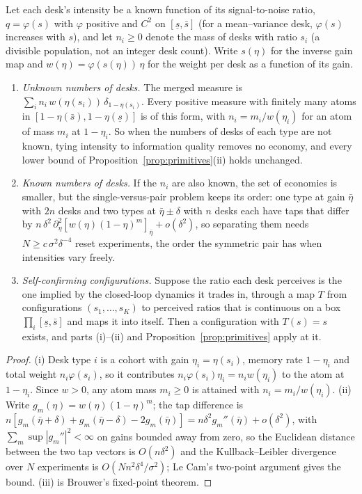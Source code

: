 \begin{proposition}\label{prop:tied}
Let each desk's intensity be a known function of its signal-to-noise ratio, $q=\varphi(s)$ with $\varphi$ positive and $C^2$ on $[\underline s,\bar s]$ (for a mean--variance desk, $\varphi(s)$ increases with $s$), and let $n_i\ge0$ denote the mass of desks with ratio $s_i$ (a divisible population, not an integer desk count). Write $s(\eta)$ for the inverse gain map and $w(\eta)=\varphi(s(\eta))\,\eta$ for the weight per desk as a function of its gain.
\begin{enumerate}[label=(\roman*)]
\item \emph{Unknown numbers of desks.} The merged measure is $\sum_in_i\,w(\eta(s_i))\,\delta_{1-\eta(s_i)}$. Every positive measure with finitely many atoms in $[1-\eta(\bar s),1-\eta(\underline s)]$ is of this form, with $n_i=m_i/w(\eta_i)$ for an atom of mass $m_i$ at $1-\eta_i$. So when the numbers of desks of each type are not known, tying intensity to information quality removes no economy, and every lower bound of Proposition~\ref{prop:primitives}(ii) holds unchanged.
\item \emph{Known numbers of desks.} If the $n_i$ are also known, the set of economies is smaller, but the single-versus-pair problem keeps its order: one type at gain $\bar\eta$ with $2n$ desks and two types at $\bar\eta\pm\delta$ with $n$ desks each have taps that differ by $n\,\delta^2\,\partial_\eta^2[w(\eta)(1-\eta)^m]_{\bar\eta}+o(\delta^2)$, so separating them needs $N\ge c\,\sigma^2\delta^{-4}$ reset experiments, the order the symmetric pair has when intensities vary freely.
\item \emph{Self-confirming configurations.} Suppose the ratio each desk perceives is the one implied by the closed-loop dynamics it trades in, through a map $T$ from configurations $(s_1,\dots,s_K)$ to perceived ratios that is continuous on a box $\prod_i[\underline s,\bar s]$ and maps it into itself. Then a configuration with $T(s)=s$ exists, and parts (i)--(ii) and Proposition~\ref{prop:primitives} apply at it.
\end{enumerate}
\end{proposition}

\begin{proof}
(i) Desk type $i$ is a cohort with gain $\eta_i=\eta(s_i)$, memory rate $1-\eta_i$ and total weight $n_i\varphi(s_i)$, so it contributes $n_i\varphi(s_i)\eta_i=n_iw(\eta_i)$ to the atom at $1-\eta_i$. Since $w>0$, any atom mass $m_i\ge0$ is attained with $n_i=m_i/w(\eta_i)$. (ii) Write $g_m(\eta)=w(\eta)(1-\eta)^m$; the tap difference is $n[g_m(\bar\eta+\delta)+g_m(\bar\eta-\delta)-2g_m(\bar\eta)]=n\delta^2g_m''(\bar\eta)+o(\delta^2)$, with $\sum_m\sup|g_m''|^2<\infty$ on gains bounded away from zero, so the Euclidean distance between the two tap vectors is $O(n\delta^2)$ and the Kullback--Leibler divergence over $N$ experiments is $O(Nn^2\delta^4/\sigma^2)$; Le Cam's two-point argument gives the bound. (iii) is Brouwer's fixed-point theorem.
\end{proof}


